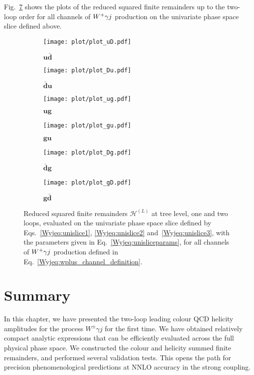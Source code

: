 \documentclass[main.tex]{subfiles}
\begin{document}
Fig.~\ref{Wyjfig:plots} shows the plots of the reduced squared finite remainders up to the two-loop order for all channels of $W^+\gamma j$ production on the univariate phase space slice defined above. 
%
\begin{figure}[t!]
\centering
\begin{subfigure}{.5\textwidth}
    \centering
    \texttt{[image: plot/plot\_uD.pdf]}
    \label{Wyjfig:uD}
    \caption{$\mathbf{u\bar{d}}$}
\end{subfigure}%
\begin{subfigure}{.5\textwidth}
    \centering
    \texttt{[image: plot/plot\_Du.pdf]}
    \label{Wyjfig:Du}
    \caption{$\mathbf{\bar{d}u}$}
\end{subfigure}
\begin{subfigure}{.5\textwidth}
    \centering
    \texttt{[image: plot/plot\_ug.pdf]}
    \label{Wyjfig:ug}
    \caption{$\mathbf{ug}$}
\end{subfigure}%
\begin{subfigure}{.5\textwidth}
    \centering
    \texttt{[image: plot/plot\_gu.pdf]}
    \label{Wyjfig:gu}
    \caption{$\mathbf{gu}$}
\end{subfigure}
\begin{subfigure}{.5\textwidth}
    \centering
    \texttt{[image: plot/plot\_Dg.pdf]}
    \label{Wyjfig:Dg}
    \caption{$\mathbf{\bar{d}g}$}
\end{subfigure}%
\begin{subfigure}{.5\textwidth}
    \centering
    \texttt{[image: plot/plot\_gD.pdf]}
    \label{Wyjfig:gD}
    \caption{$\mathbf{g\bar{d}}$}
\end{subfigure}
\caption[short]{Reduced squared finite remainders $\mathcal{H}^{(L)}$ at tree level, one and two loops, evaluated on the univariate phase space slice defined by Eqs.~\ref{Wyjeq:unislice1}, \ref{Wyjeq:unislice2} and~\ref{Wyjeq:unislice3}, with the parameters given in Eq.~\ref{Wyjeq:unisliceparams}, for all channels of $W^+\gamma j$ production defined in Eq.~\ref{Wyjeq:wplus_channel_definition}.}
\label{Wyjfig:plots}
\end{figure}

\section{Summary}
\label{wyjsec:conclusions}
In this chapter, we have presented the two-loop leading colour QCD helicity amplitudes for the
process $W^{\pm}\gamma j$ for the first time. We have obtained relatively compact analytic
expressions that can be efficiently evaluated across the full physical phase space. We constructed
the colour and helicity summed finite remainders, and performed several validation tests. This opens
the path for precision phenomenological predictions at NNLO accuracy in the strong coupling.
\end{document}
